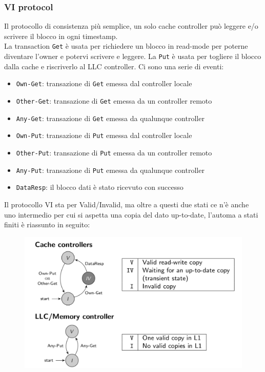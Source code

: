 \documentclass[12pt, oneside]{extbook} %
\begin{document}
\subsubsection{VI protocol}
Il protocollo di consistenza più semplice, un solo cache controller può leggere e/o scrivere il blocco in ogni timestamp.\\ La transaction \texttt{Get} è usata per richiedere un blocco in read-mode per poterne diventare l'owner e potervi scrivere e leggere. La \texttt{Put} è usata per togliere il blocco dalla cache e riscriverlo al LLC controller. Ci sono una serie di eventi:
\begin{itemize}
	\item \texttt{Own-Get}: transazione di \texttt{Get} emessa dal controller locale
	\item \texttt{Other-Get}: transazione di \texttt{Get} emessa da un controller remoto
	\item \texttt{Any-Get}: transazione di \texttt{Get} emessa da qualunque controller
	\item \texttt{Own-Put}: transazione di \texttt{Put} emessa dal controller locale
	\item \texttt{Other-Put}: transazione di \texttt{Put} emessa da un controller remoto
	\item \texttt{Any-Put}: transazione di \texttt{Put} emessa da qualunque controller
	\item \texttt{DataResp}: il blocco dati è stato ricevuto con successo
\end{itemize}
Il protocollo VI sta per Valid/Invalid, ma oltre a questi due stati ce n'è anche uno intermedio per cui si aspetta una copia del dato up-to-date, l'automa a stati finiti è riassunto in seguito:\\
\begin{figure}[!h]
	\includegraphics[scale=0.3]{immagini/vi_prot.png}
\end{figure}
\end{document}
